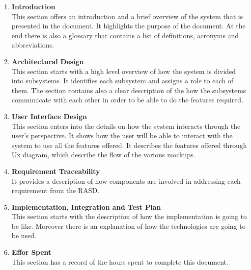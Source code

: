 \begin{enumerate}
    \item \textbf{Introduction}\\
            This section offers an introduction and a brief overview of the system that is presented in the document. 
            It highlights the purpose of the document.
            At the end there is also a glossary that contains a list of definitions, acronyms and abbreviations.
            
    \item \textbf{Architectural Design}\\
            This section starts with a high level overview of how the system is divided into subsystems. It identifies each subsystem
            and assigns a role to each of them. 
            The section contains also a clear description of the how the subsystems communicate with each other in order to 
            be able to do the features required.
            
    \item \textbf{User Interface Design}\\
            This section enters into the details on how the system interacts through the user’s perspective. 
            It shows how the user will be able to interact with the system to use all the features offered.
            It describes the features offered through Ux diagram, which describe the flow of the various mockups. 
            
    \item \textbf{Requirement Traceability}\\
        It provides a description of how components are involved in addressing each requirement from the RASD.
            
    \item \textbf{Implementation, Integration and Test Plan}\\
        This section starts with the description of how the implementation is going to be like. 
        Moreover there is an explanation of how the technologies are going to be used.
            
    \item \textbf{Effor Spent}\\
            This section has a record of the hours spent to complete this document.

\end{enumerate}